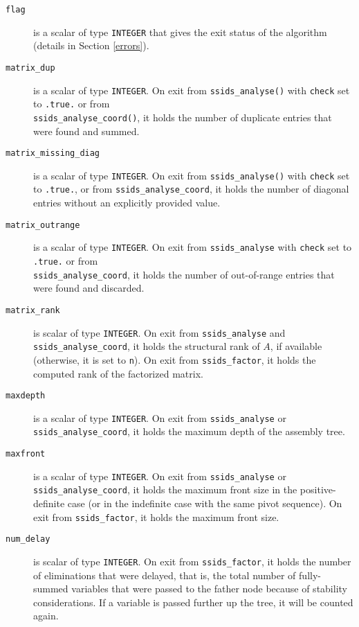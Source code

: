 \documentclass{spral}
\begin{document}
\begin{description}

\item[\texttt{flag}] is a scalar of type  {\tt INTEGER}
that gives the exit status of the algorithm (details in Section \ref{errors}).

\item[\texttt{matrix\_dup}] is a scalar  of type  {\tt INTEGER}.
On exit from {\tt ssids\_analyse()}
with {\tt check} set to {\tt .true.} or from \\
{\tt ssids\_analyse\_coord()}, it holds the
number of duplicate entries that were found and summed.

\item[\texttt{matrix\_missing\_diag}] is a scalar of type {\tt INTEGER}.
On exit from {\tt ssids\_analyse()} with {\tt check} set to {\tt .true.},
or from {\tt ssids\_analyse\_coord}, it holds the number of diagonal
entries without an explicitly provided value.

\item[\texttt{matrix\_outrange}] is a scalar  of type  {\tt INTEGER}.
On exit from {\tt ssids\_analyse}
with {\tt check} set to {\tt .true.} or from \\
{\tt ssids\_analyse\_coord}, it holds the
number of out-of-range entries that were   found and discarded.

\item[\texttt{matrix\_rank}] is scalar of type  {\tt INTEGER}. On exit from
{\tt ssids\_analyse} and {\tt ssids\_analyse\_coord}, it holds
the structural rank of $A$, if available (otherwise, it is set to {\tt n}).
On exit from
{\tt ssids\_factor}, it holds the computed rank of
the factorized matrix.

\item[\texttt{maxdepth}] is a scalar of type  {\tt INTEGER}. On exit from
{\tt ssids\_analyse}  or {\tt ssids\_analyse\_coord}, it holds the maximum depth of the assembly tree.

\item[\texttt{maxfront}] is a scalar of type  {\tt INTEGER}. On exit from
{\tt ssids\_analyse}  or {\tt ssids\_analyse\_coord}, it holds the maximum front size
in the positive-definite case (or in the indefinite case with
the same pivot sequence). On exit from
{\tt ssids\_factor}, it holds the maximum front size.

\item[\texttt{num\_delay}] is scalar of type  {\tt INTEGER}. On exit from
{\tt ssids\_factor}, it holds the
number of eliminations that were
delayed, that is, the total number of fully-summed
variables that were passed to the father node because
of stability considerations. If a variable is passed
further up the tree, it will be counted again.


\end{description}
\end{document}
